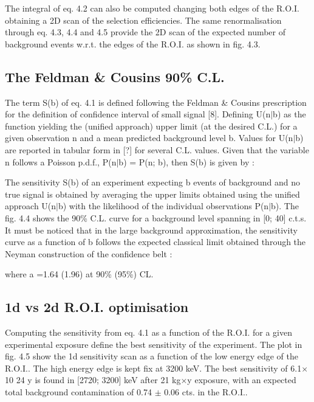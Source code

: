 \documentclass[main.tex]{subfiles}
\begin{document}
\bigskip


\NI The integral of eq. 4.2 can also be computed changing both edges of the R.O.I. obtaining a 2D scan of the selection efficiencies. The same renormalisation through eq. 4.3, 4.4 and 4.5 provide the 2D scan of the expected number of background events w.r.t. the edges of the R.O.I. as shown in fig. 4.3.


\subsection{The Feldman \& Cousins 90\% C.L.}
 

\NI The term S(b) of eq. 4.1 is defined following the Feldman \& Cousins prescription for the definition of confidence interval of small signal [8]. Defining U(n$|$b) as the function yielding the (unified approach) upper limit (at the desired C.L.) for a given observation n and a mean predicted background level b. Values for U(n$|$b) are reported in tabular form in [?] for several C.L. values. Given that the variable n follows a Poisson p.d.f., P(n$|$b) = P(n; b), then S(b) is given by : 


\bigskip


\NI The sensitivity S(b) of an experiment expecting b events of background and no true signal is obtained by averaging the upper limits obtained using the unified approach U(n$|$b) with the likelihood of the individual observations P(n$|$b). The fig. 4.4 shows the 90\% C.L. curve for a background level spanning in [0; 40] c.t.s. It must be noticed that in the large background approximation, the sensitivity curve as a function of b follows the expected classical limit obtained through the Neyman construction of the confidence belt :


\bigskip


\NI where a =1.64 (1.96) at 90\% (95\%) CL.


\subsection{1d vs 2d R.O.I. optimisation}


\NI Computing the sensitivity from eq. 4.1 as a function of the R.O.I. for a given experimental exposure define the best sensitivity of the experiment. The plot in fig. 4.5 show the 1d sensitivity scan as a function of the low energy edge of the R.O.I.. The high energy edge is kept fix at 3200 keV. The best sensitivity of 6.1$\times$10 24 y is found in [2720; 3200] keV after 21 kg$\times$y exposure, with an expected total background contamination of 0.74 $\pm$ 0.06 cts. in the R.O.I..
\end{document}
